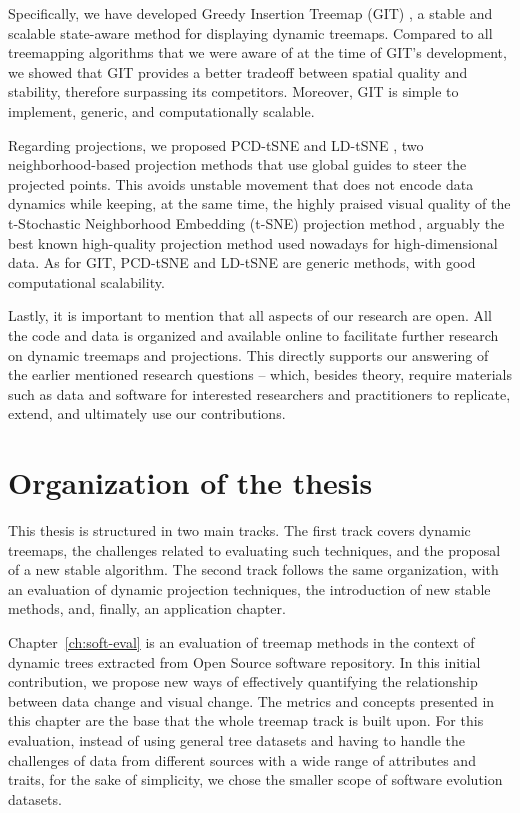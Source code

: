 Specifically, we have developed Greedy Insertion Treemap (GIT) \citep{vernier18git}, a stable and scalable state-aware method for displaying dynamic treemaps. Compared to all treemapping algorithms that we were aware of at the time of GIT's development, we showed that GIT provides a better tradeoff between spatial quality and stability, therefore surpassing its competitors. Moreover, GIT is simple to implement, generic, and computationally scalable.

Regarding projections, we proposed PCD-tSNE and LD-tSNE \citep{Vernier2021}, two neighborhood-based projection methods that use global guides to steer the projected points. This avoids unstable movement that does not encode data dynamics while keeping, at the same time, the highly praised visual quality of the t-Stochastic Neighborhood Embedding (t-SNE) projection method\,\citep{tsne}, arguably the best known high-quality projection method used nowadays for high-dimensional data. As for GIT, PCD-tSNE and LD-tSNE are generic methods, with good computational scalability.

\bigbreak

Lastly, it is important to mention that all aspects of our research are open. All the code and data is organized and available online to facilitate further research on dynamic treemaps and projections. This directly supports our answering of the earlier mentioned research questions -- which, besides theory, require materials such as data and software for interested researchers and practitioners to replicate, extend, and ultimately use our contributions.

\section{Organization of the thesis}

This thesis is structured in two main tracks. The first track covers dynamic treemaps, the challenges related to evaluating such techniques, and the proposal of a new stable algorithm. The second track follows the same organization, with an evaluation of dynamic projection techniques, the introduction of new stable methods, and, finally, an application chapter.

Chapter~\ref{ch:soft-eval} is an evaluation of treemap methods in the context of dynamic trees extracted from Open Source software repository. In this initial contribution, we propose new ways of effectively quantifying the relationship between data change and visual change. The metrics and concepts presented in this chapter are the base that the whole treemap track is built upon. For this evaluation, instead of using general tree datasets and having to handle the challenges of data from different sources with a wide range of attributes and traits, for the sake of simplicity, we chose the smaller scope of software evolution datasets.

